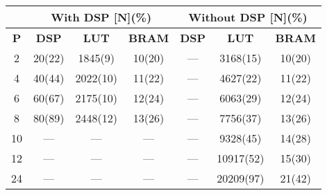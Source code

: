 \documentclass[a1paper,portrait,fontscale=0.43]{baposter}
\newcommand{\compresslist}{%
  \setlength{\itemsep}{0pt}%
  \setlength{\parskip}{1pt}%
  \setlength{\parsep}{0pt}%
}
\newenvironment{boenumerate}
  {\begin{enumerate}\renewcommand\labelenumi{\textbf\theenumi.}}
  {\end{enumerate}}
\begin{document}
\begin{poster}
{\begin{multicols}{2}
\end{multicols}
\begin{center}
\begin{tabular}{|c|c|c|c|c|c|c|}
  \hline
  & \multicolumn{3}{c|}{\textbf{With DSP [N](\%)}} & \multicolumn{3}{c|}{\textbf{Without DSP [N](\%)}} \\ \hline
  \textbf{P}  & \textbf{DSP}            & \textbf{LUT}        & \textbf{BRAM}       & \textbf{DSP}         & \textbf{LUT}           & \textbf{BRAM}         \\ \hline
  2  & 20(22)         & 1845(9)    & 10(20)     & ---         & 3168(15)      & 10(20)         \\ \hline
  4  & 40(44)         & 2022(10)   & 11(22)     & ---         & 4627(22)      & 11(22)         \\ \hline
  6  & 60(67)         & 2175(10)   & 12(24)     & ---         & 6063(29)      & 12(24)         \\ \hline
  8  & 80(89)         & 2448(12)   & 13(26)     & ---         & 7756(37)      & 13(26)         \\ \hline
  10 & ---            & ---        & ---        & ---         & 9328(45)      & 14(28)         \\ \hline
  12 & ---            & ---        & ---        & ---         & 10917(52)     & 15(30)         \\ \hline
  24 & ---            & ---        & ---        & ---         & 20209(97)     & 21(42)         \\ \hline
\end{tabular}           
\label{res_table}
\end{center}
}
	
\end{poster}
\end{document}
